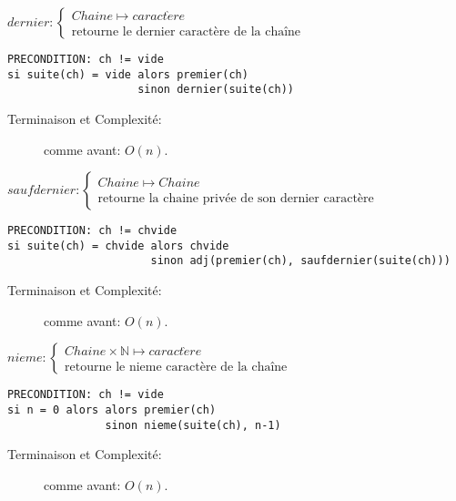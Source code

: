 \documentclass[10pt]{article}\usepackage[correction,nu]{esial}
\begin{document}
\begin{Question}
  $dernier: \left\{
    \begin{array}{l}
      Chaine\mapsto caract\grave{e}re\\
      \text{retourne le dernier caractère de la chaîne}
    \end{array}\right.$  
\end{Question}
\begin{Reponse}
  \begin{Verbatim}[label=dernier(ch)]
PRECONDITION: ch != vide
si suite(ch) = vide alors premier(ch)
                    sinon dernier(suite(ch))    
  \end{Verbatim}
  \begin{description}
  \item[Terminaison et Complexité:] comme avant: $O(n)$. 
  \end{description}
\end{Reponse}

\begin{Question}
  $saufdernier: \left\{
    \begin{array}{l}
      Chaine\mapsto Chaine\\
      \text{retourne la chaine privée de son dernier caractère}
    \end{array}\right.$  
\end{Question}
\begin{Reponse}
  \begin{Verbatim}[label=saufdernier(ch)]
PRECONDITION: ch != chvide
si suite(ch) = chvide alors chvide
                      sinon adj(premier(ch), saufdernier(suite(ch)))    
  \end{Verbatim}
  \begin{description}
  \item[Terminaison et Complexité:] comme avant: $O(n)$. 
  \end{description}
\end{Reponse}

\begin{Question}
  $nieme: \left\{
    \begin{array}{l}
      Chaine\times\mathbb{N}\mapsto caract\grave{e}re\\
      \text{retourne le nieme caractère de la chaîne}
    \end{array}\right.$  
\end{Question}
\begin{Reponse}
  \begin{Verbatim}[label=nieme(ch\quotesinglbase n)]
PRECONDITION: ch != vide
si n = 0 alors alors premier(ch)
               sinon nieme(suite(ch), n-1)    
  \end{Verbatim}
  \begin{description}
  \item[Terminaison et Complexité:] comme avant: $O(n)$. 
  \end{description}
\end{Reponse}
\end{document}

